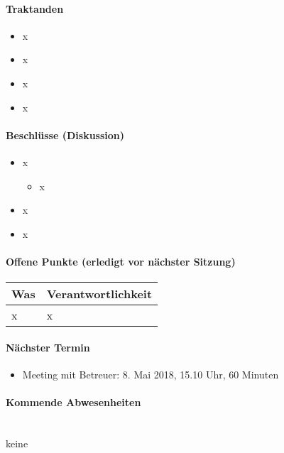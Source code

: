 \paragraph{Traktanden}
\begin{itemize}	
	\item x
	\item x
	\item x
	\item x
\end{itemize}

\paragraph{Beschlüsse (Diskussion)}
\begin{itemize}	
	\item x
	\begin{itemize}
		\item x
	\end{itemize}
	\item x
	\item x
\end{itemize}

\paragraph{Offene Punkte (erledigt vor nächster Sitzung)} \mbox{}

\begin{table}[H]
	\centering
	\begin{tabularx}{\textwidth}{X | p{4.5cm}}
		\rowcolor{gray!50}
		\textbf{Was} & \textbf{Verantwortlichkeit} \\
		\hline
		x & x \\	
	\end{tabularx}
	\label{tab:my-label}
\end{table}

\paragraph{Nächster Termin}
\begin{itemize}	
	\item Meeting mit Betreuer: 8. Mai 2018, 15.10 Uhr, 60 Minuten
\end{itemize}

\paragraph{Kommende Abwesenheiten} \mbox{}\\
keine

\newpage
